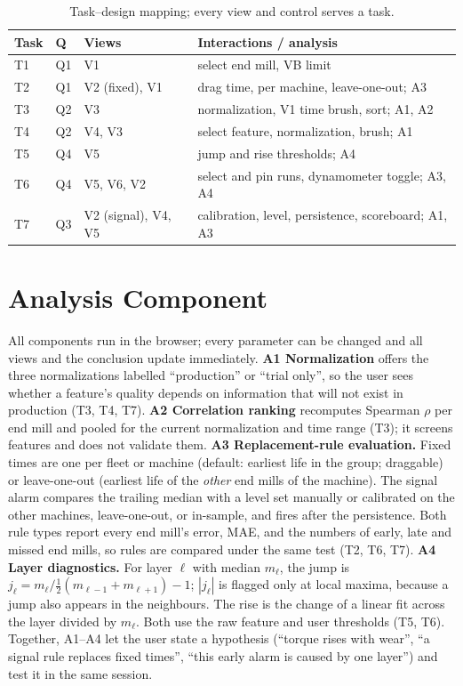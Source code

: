 \documentclass{vgtc}                          %
\begin{document}
\begin{table}[tb]
  \caption{Task--design mapping; every view and control serves a task.}
  \label{tab:mapping}
  \scriptsize\centering
  \begin{tabular}{@{}p{}p{}p{}p{}@{}}
    \toprule
    Task & Q & Views & Interactions / analysis \\
    \midrule
    T1 & Q1 & V1 & select end mill, VB limit \\
    T2 & Q1 & V2 (fixed), V1 & drag time, per machine, leave-one-out; A3 \\
    T3 & Q2 & V3 & normalization, V1 time brush, sort; A1, A2 \\
    T4 & Q2 & V4, V3 & select feature, normalization, brush; A1 \\
    T5 & Q4 & V5 & jump and rise thresholds; A4 \\
    T6 & Q4 & V5, V6, V2 & select and pin runs, dynamometer toggle; A3, A4 \\
    T7 & Q3 & V2 (signal), V4, V5 & calibration, level, persistence, scoreboard; A1, A3 \\
    \bottomrule
  \end{tabular}
\end{table}

\section{Analysis Component}
\label{sec:analysis}
All components run in the browser; every parameter can be changed and all views and the conclusion update immediately.
\textbf{A1 Normalization} offers the three normalizations labelled ``production'' or ``trial only'', so the user sees
whether a feature's quality depends on information that will not exist in production (T3, T4, T7).
\textbf{A2 Correlation ranking} recomputes Spearman $\rho$ per end mill and pooled for the current normalization and time
range (T3); it screens features and does not validate them.
\textbf{A3 Replacement-rule evaluation.} Fixed times are one per fleet or machine (default: earliest life in the group;
draggable) or leave-one-out (earliest life of the \emph{other} end mills of the machine). The signal alarm compares the
trailing median with a level set manually or calibrated on the other machines, leave-one-out, or in-sample, and fires after
the persistence. Both rule types report every end mill's error, MAE, and the numbers of early, late and missed end mills,
so rules are compared under the same test (T2, T6, T7).
\textbf{A4 Layer diagnostics.} For layer $\ell$ with median $m_\ell$, the jump is $j_\ell=m_\ell/\tfrac12(m_{\ell-1}+m_{\ell+1})-1$;
$|j_\ell|$ is flagged only at local maxima, because a jump also appears in the neighbours. The rise is the change of a
linear fit across the layer divided by $m_\ell$. Both use the raw feature and user thresholds (T5, T6).
Together, A1--A4 let the user state a hypothesis (``torque rises with wear'', ``a signal rule replaces fixed times'',
``this early alarm is caused by one layer'') and test it in the same session.
\end{document}
